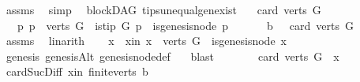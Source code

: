 \begin{isabellebody}
\ assms\ \isamarkupfalse%
\ simp\isanewline
{}\isamarkupfalse%
%
\endisatagproof
{\isafoldproof}%
%
\isadelimproof
\isanewline
%
\endisadelimproof
\isanewline
\isanewline
\isanewline
{}\isamarkupfalse%
\ {\isacharparenleft}{\kern0pt}\ blockDAG{\isacharparenright}{\kern0pt}\ tips{\isacharunderscore}{\kern0pt}unequal{\isacharunderscore}{\kern0pt}gen{\isacharunderscore}{\kern0pt}exist{\isacharcolon}{\kern0pt}\isanewline
\ \ \ {\isachardoublequoteopen}card{\isacharparenleft}{\kern0pt}\ verts\ G{\isacharparenright}{\kern0pt}\ {\isachargreater}{\kern0pt}\ {}{\isachardoublequoteclose}\isanewline
\ \ \ {\isachardoublequoteopen}{\isasymexists}p{\isachardot}{\kern0pt}\ p\ {\isasymin}\ verts\ G\ {\isasymand}\ is{\isacharunderscore}{\kern0pt}tip\ G\ p\ {\isasymand}\ {\isasymnot}is{\isacharunderscore}{\kern0pt}genesis{\isacharunderscore}{\kern0pt}node\ p\ {\isachardoublequoteclose}\isanewline
%
\isadelimproof
%
\endisadelimproof
%
\isatagproof
{}\isamarkupfalse%
\ {\isacharminus}{\kern0pt}\isanewline
\ \ \isamarkupfalse%
\ b{}{\isacharcolon}{\kern0pt}\ {\isachardoublequoteopen}{}\ {\isacharless}{\kern0pt}\ card\ {\isacharparenleft}{\kern0pt}verts\ G{\isacharparenright}{\kern0pt}{\isachardoublequoteclose}\ \isamarkupfalse%
\ assms\ \isamarkupfalse%
\ linarith\isanewline
\ \ \isamarkupfalse%
\ x\ \ x{\isacharunderscore}{\kern0pt}in{\isacharcolon}{\kern0pt}\ {\isachardoublequoteopen}x\ {\isasymin}\ {\isacharparenleft}{\kern0pt}verts\ G{\isacharparenright}{\kern0pt}\ {\isasymand}\ is{\isacharunderscore}{\kern0pt}genesis{\isacharunderscore}{\kern0pt}node\ x{\isachardoublequoteclose}\ \isanewline
\ \ \ \ \isamarkupfalse%
\ genesis\ genesisAlt\ genesis{\isacharunderscore}{\kern0pt}node{\isacharunderscore}{\kern0pt}def\ \ \isamarkupfalse%
\ blast\isanewline
\ \ \isamarkupfalse%
\ \isamarkupfalse%
\ {\isachardoublequoteopen}{}\ {\isacharless}{\kern0pt}\ card\ {\isacharparenleft}{\kern0pt}{\isacharparenleft}{\kern0pt}verts\ G{\isacharparenright}{\kern0pt}\ {\isacharminus}{\kern0pt}\ {\isacharbraceleft}{\kern0pt}x{\isacharbraceright}{\kern0pt}{\isacharparenright}{\kern0pt}{\isachardoublequoteclose}\ \isamarkupfalse%
\ card{\isacharunderscore}{\kern0pt}Suc{\isacharunderscore}{\kern0pt}Diff{}\ x{\isacharunderscore}{\kern0pt}in\ finite{\isacharunderscore}{\kern0pt}verts\ b{}\ \isamarkupfalse%

\end{isabellebody}
